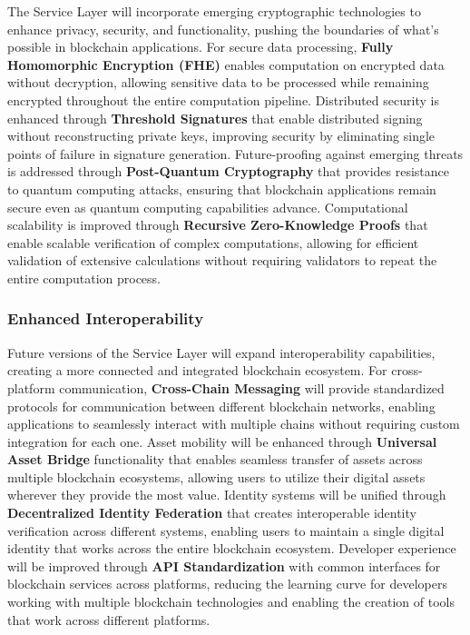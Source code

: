\documentclass[11pt]{article}
\begin{document}
The Service Layer will incorporate emerging cryptographic technologies to enhance privacy, security, and functionality, pushing the boundaries of what's possible in blockchain applications. For secure data processing, \textbf{Fully Homomorphic Encryption (FHE)} enables computation on encrypted data without decryption, allowing sensitive data to be processed while remaining encrypted throughout the entire computation pipeline. Distributed security is enhanced through \textbf{Threshold Signatures} that enable distributed signing without reconstructing private keys, improving security by eliminating single points of failure in signature generation. Future-proofing against emerging threats is addressed through \textbf{Post-Quantum Cryptography} that provides resistance to quantum computing attacks, ensuring that blockchain applications remain secure even as quantum computing capabilities advance. Computational scalability is improved through \textbf{Recursive Zero-Knowledge Proofs} that enable scalable verification of complex computations, allowing for efficient validation of extensive calculations without requiring validators to repeat the entire computation process.

\subsubsection{Enhanced Interoperability}
\label{subsubsec:enhanced-interop}

Future versions of the Service Layer will expand interoperability capabilities, creating a more connected and integrated blockchain ecosystem. For cross-platform communication, \textbf{Cross-Chain Messaging} will provide standardized protocols for communication between different blockchain networks, enabling applications to seamlessly interact with multiple chains without requiring custom integration for each one. Asset mobility will be enhanced through \textbf{Universal Asset Bridge} functionality that enables seamless transfer of assets across multiple blockchain ecosystems, allowing users to utilize their digital assets wherever they provide the most value. Identity systems will be unified through \textbf{Decentralized Identity Federation} that creates interoperable identity verification across different systems, enabling users to maintain a single digital identity that works across the entire blockchain ecosystem. Developer experience will be improved through \textbf{API Standardization} with common interfaces for blockchain services across platforms, reducing the learning curve for developers working with multiple blockchain technologies and enabling the creation of tools that work across different platforms.
\end{document}
